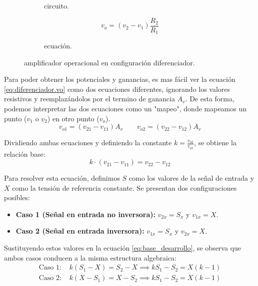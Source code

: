 \begin{figure}[!ht]
  \centering
  \begin{subfigure}[c]{0.6\textwidth}
    
    \caption{circuito.}
    \label{crkt:diferenciador}
  \end{subfigure}
  \hfill
  \begin{subfigure}[c]{0.3\textwidth}
    \begin{equation}
      v_o = \left(v_2 - v_1 \right) \frac{R_2}{R_1}
      \label{eq:diferenciador.vo}
    \end{equation}
    \caption{ecuación.}
  \end{subfigure}
  \caption{amplificador operacional en configuración diferenciador.}
\end{figure}

Para poder obtener los potenciales y ganancias, es mas fácil ver la ecuación \ref{eq:diferenciador.vo} como dos
ecuaciones diferentes, ignorando los valores resistivos y reemplazándolos por el termino de ganancia $A_v$. De esta
forma, podemos interpretar las dos ecuaciones como un "mapeo", donde mapeamos un punto ($v_1$ o $v_2$) en otro punto
($v_o$).
\begin{equation}
  v_{o1} = \left( v_{21} - v_{11} \right) A_v \qquad v_{o2} = \left( v_{22} - v_{12} \right) A_v
\end{equation}

Dividiendo ambas ecuaciones y definiendo la constante $k = \frac{v_{o2}}{v_{o1}}$, se obtiene la relación base:
\begin{equation}
  k \cdot (v_{21} - v_{11}) = v_{22} - v_{12}
  \label{eq:base_desarrollo}
\end{equation}

Para resolver esta ecuación, definimos $S$ como los valores de la señal de entrada y $X$ como la tensión de referencia
constante. Se presentan dos configuraciones posibles:
\begin{itemize}
    \item \textbf{Caso 1 (Señal en entrada no inversora):} $v_{2x} = S_x$ y $v_{1x} = X$.
    \item \textbf{Caso 2 (Señal en entrada inversora):} $v_{1x} = S_x$ y $v_{2x} = X$.
\end{itemize}

Sustituyendo estos valores en la ecuación \ref{eq:base_desarrollo}, se observa que ambos casos conducen a la misma
estructura algebraica:
\begin{align*}
    \text{Caso 1: } & k(S_1 - X) = S_2 - X \implies kS_1 - S_2 = X(k - 1) \\
    \text{Caso 2: } & k(X - S_1) = X - S_2 \implies kS_1 - S_2 = X(k - 1)
\end{align*}


